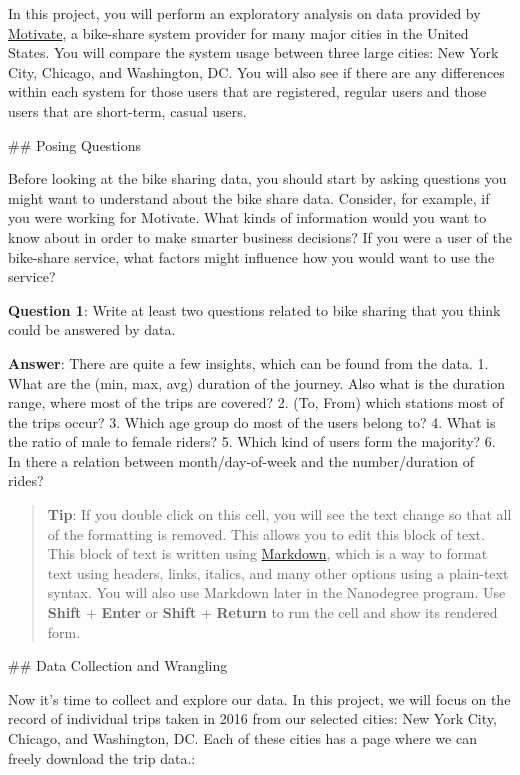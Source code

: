 \documentclass[11pt]{article}
\begin{document}
In this project, you will perform an exploratory analysis on data
provided by \href{https://www.motivateco.com/}{Motivate}, a bike-share
system provider for many major cities in the United States. You will
compare the system usage between three large cities: New York City,
Chicago, and Washington, DC. You will also see if there are any
differences within each system for those users that are registered,
regular users and those users that are short-term, casual users.

     \#\# Posing Questions

Before looking at the bike sharing data, you should start by asking
questions you might want to understand about the bike share data.
Consider, for example, if you were working for Motivate. What kinds of
information would you want to know about in order to make smarter
business decisions? If you were a user of the bike-share service, what
factors might influence how you would want to use the service?

\textbf{Question 1}: Write at least two questions related to bike
sharing that you think could be answered by data.

\textbf{Answer}: There are quite a few insights, which can be found from
the data. 1. What are the (min, max, avg) duration of the journey. Also
what is the duration range, where most of the trips are covered? 2. (To,
From) which stations most of the trips occur? 3. Which age group do most
of the users belong to? 4. What is the ratio of male to female riders?
5. Which kind of users form the majority? 6. In there a relation between
month/day-of-week and the number/duration of rides?

\begin{quote}
\textbf{Tip}: If you double click on this cell, you will see the text
change so that all of the formatting is removed. This allows you to edit
this block of text. This block of text is written using
\href{http://daringfireball.net/projects/markdown/syntax}{Markdown},
which is a way to format text using headers, links, italics, and many
other options using a plain-text syntax. You will also use Markdown
later in the Nanodegree program. Use \textbf{Shift} + \textbf{Enter} or
\textbf{Shift} + \textbf{Return} to run the cell and show its rendered
form.
\end{quote}

     \#\# Data Collection and Wrangling

Now it's time to collect and explore our data. In this project, we will
focus on the record of individual trips taken in 2016 from our selected
cities: New York City, Chicago, and Washington, DC. Each of these cities
has a page where we can freely download the trip data.:
\end{document}

